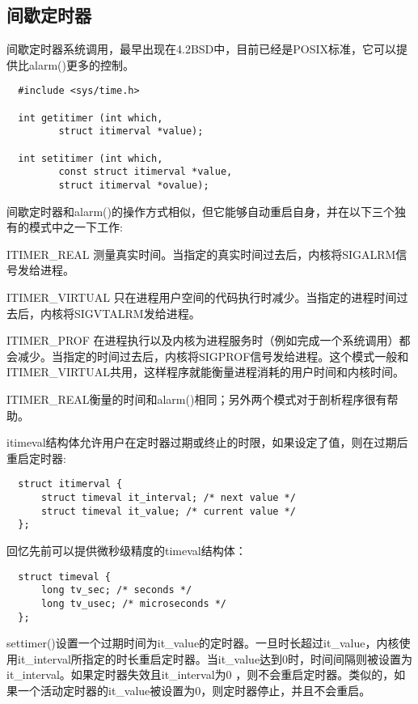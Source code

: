 \subsection{间歇定时器}

间歇定时器系统调用，最早出现在4.2BSD中，目前已经是POSIX标准，它可以提供比alarm()更多的控制。 

\begin{lstlisting}
  #include <sys/time.h>

  int getitimer (int which,
		 struct itimerval *value);

  int setitimer (int which,
		 const struct itimerval *value,
		 struct itimerval *ovalue);
\end{lstlisting}
间歇定时器和alarm()的操作方式相似，但它能够自动重启自身，并在以下三个独有的模式中之一下工作:

\begin{eqlist*}
\item [ITIMER\_REAL]
测量真实时间。当指定的真实时间过去后，内核将SIGALRM信号发给进程。 
\item [ITIMER\_VIRTUAL]
只在进程用户空间的代码执行时减少。当指定的进程时间过去后，内核将SIGVTALRM发给进程。
\item [ITIMER\_PROF]
在进程执行以及内核为进程服务时（例如完成一个系统调用）都会减少。当指定的时间过去后，内核将SIGPROF信号发给进程。这个模式一般和ITIMER\_VIRTUAL共用，这样程序就能衡量进程消耗的用户时间和内核时间。
\end{eqlist*}

ITIMER\_REAL衡量的时间和alarm()相同；另外两个模式对于剖析程序很有帮助。

itimeval结构体允许用户在定时器过期或终止的时限，如果设定了值，则在过期后重启定时器: 

\begin{lstlisting}
  struct itimerval {
      struct timeval it_interval; /* next value */
      struct timeval it_value; /* current value */
  };
\end{lstlisting}

回忆先前可以提供微秒级精度的timeval结构体：

\begin{lstlisting}
  struct timeval {
      long tv_sec; /* seconds */
      long tv_usec; /* microseconds */
  };
\end{lstlisting}

settimer()设置一个过期时间为it\_value的定时器。一旦时长超过it\_value，内核使用it\_interval所指定的时长重启定时器。当it\_value达到0时，时间间隔则被设置为it\_interval。如果定时器失效且it\_interval为0 ，则不会重启定时器。类似的，如果一个活动定时器的it\_value被设置为0，则定时器停止，并且不会重启。

